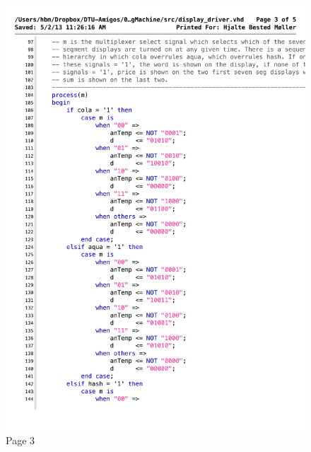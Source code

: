 \begin{figure}[!h]
\centering
\includegraphics[scale=0.7]{figs/display_driver_3.pdf}
\caption{Page 3}
\label{vhd:dispdriv3}
\end{figure}

